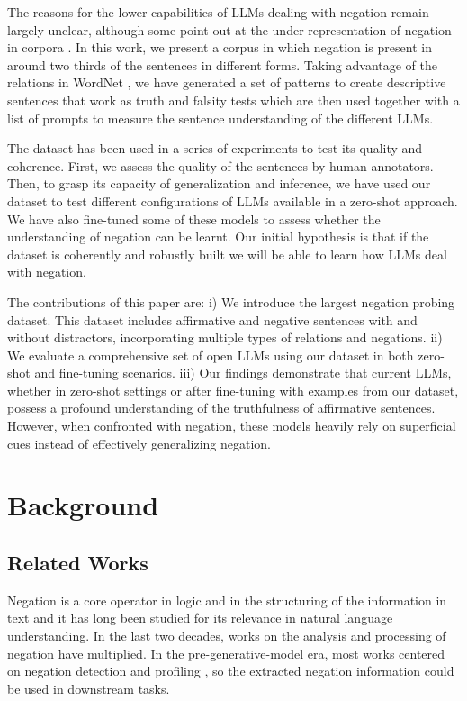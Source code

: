 \documentclass[11pt]{article}
\newcommand{\WORDNET}{WordNet}
\begin{document}
The reasons for the lower capabilities of LLMs dealing with negation remain largely unclear, although some point out at the under-representation of negation in corpora \cite{hossain-etal-2022-analysis}. In this work, we present a corpus in which negation is present in around two thirds of the sentences in different forms. Taking advantage of the relations in \WORDNET{} \cite{Fellbaum'98}, we have generated a set of patterns to create descriptive sentences that work as truth and falsity tests which are then used together with a list of prompts to measure the sentence understanding of the different LLMs. 

The dataset has been used in a series of experiments to test its quality and coherence. First, we assess the quality of the sentences by human annotators. Then, to grasp its capacity of generalization and inference, we have used our dataset to test different configurations of LLMs available in a zero-shot approach. We have also fine-tuned some of these models to assess whether the understanding of negation can be learnt. Our initial hypothesis is that if the dataset is coherently and robustly built we will be able to learn how LLMs deal with negation.



The contributions of this paper are: i) We introduce the largest negation probing dataset.  This dataset includes affirmative and negative sentences with and without distractors, incorporating multiple types of relations and negations. 
ii) We evaluate a comprehensive set of open LLMs using our dataset in both zero-shot and fine-tuning scenarios.
iii) Our findings demonstrate that current LLMs, whether in zero-shot settings or after fine-tuning with examples from our dataset, possess a profound understanding of the truthfulness of affirmative sentences. However, when confronted with negation, these models heavily rely on superficial cues instead of effectively generalizing negation.





\section{Background}

\subsection{Related Works}

Negation is a core operator in logic and in the structuring of the information in text and it has long been studied for its relevance in natural language understanding. In the last two decades, works on the analysis and processing of negation have multiplied. In the pre-generative-model era, most works centered on negation detection \cite{Chapman01,Vilares15} and profiling \cite{morante2012}, so the extracted negation information could be used in downstream tasks.
\end{document}

